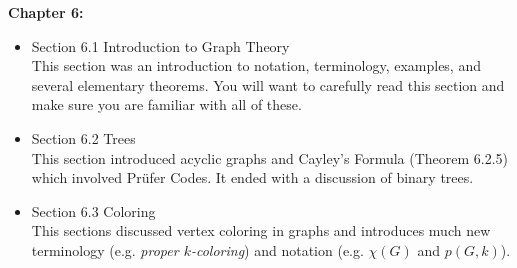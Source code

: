 \documentclass[11pt]{article}
\begin{document}
\noindent\textbf{Chapter 6:}

\begin{itemize}
\item Section 6.1 Introduction to Graph Theory\\
This section was an introduction to notation, terminology, examples, and several elementary theorems. You will want to carefully read this section and make sure you are familiar with all of these.\\
\item Section 6.2 Trees\\
This section introduced acyclic graphs and Cayley's Formula (Theorem 6.2.5) which involved Pr\"{u}fer Codes. It ended with a discussion of binary trees.\\
\item Section 6.3 Coloring\\
This sections discussed vertex coloring in graphs and introduces much new terminology (e.g. \emph{proper $k$-coloring}) and notation (e.g. $\chi(G)$ and $p(G,k)$).
\end{itemize}
\end{document}
